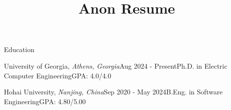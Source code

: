 \documentclass{resume} %
\begin{document}
\makeheader
\title{Anon Resume}

\begin{rSection}{Education}

\begin{rSubsection}{University of Georgia, \normalfont\textit{Athens, Georgia}}{Aug 2024 - Present}{Ph.D. in Electric Computer Engineering}{GPA: 4.0/4.0}
\vspace{-1cm}
\item[]
\end{rSubsection}
\begin{rSubsection}{Hohai University, \normalfont\textit{Nanjing, China}}{Sep 2020 - May 2024}{B.Eng. in Software Engineering}{GPA: 4.80/5.00}
\vspace{-1cm}
\item[]
\end{rSubsection}


\end{rSection}


\end{document}

